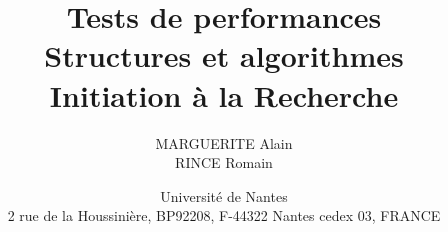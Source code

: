 \documentclass[11pt,a4paper,utf8x]{report}
\title{Tests de performances \\ Structures et algorithmes\\ Initiation à la Recherche}
\author{MARGUERITE Alain\\ RINCE Romain}
\date{Université de Nantes \\ 2 rue de la Houssinière, BP92208, F-44322 Nantes cedex 03, FRANCE}
\begin{document}
\maketitle
\renewcommand{\labelitemi}{$\bullet$} 

\clearpage

\tableofcontents
\clearpage


%
%




\end{document}
